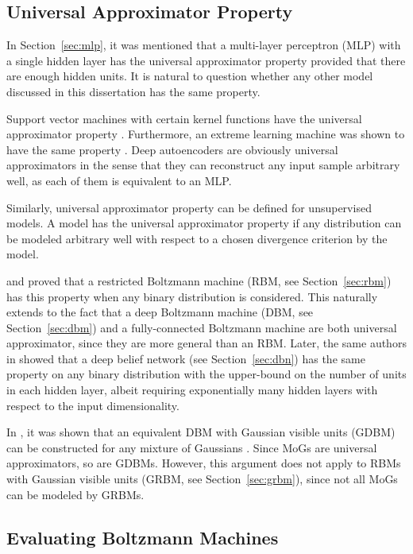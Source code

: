 \documentclass[dissertation,nocontribution,draft*]{aaltoseries}
\begin{document}
\subsection{Universal Approximator Property}
\label{sec:uap}

In Section~\ref{sec:mlp}, it was mentioned that a
multi-layer perceptron (MLP) with a single hidden layer has
the universal approximator property provided that there are
enough hidden units. %
It is natural to question whether any other model
discussed in this dissertation has the same property. 

Support vector machines with certain kernel functions have
the universal approximator property \citep{Hammer2003}.
Furthermore, an extreme learning machine was shown to have
the same property \citep{Huang2006tnn}. Deep autoencoders are
obviously universal approximators in the sense that they can
reconstruct any input sample arbitrary well, as each of them
is equivalent to an MLP.

Similarly, universal approximator property can be defined
for unsupervised models. A model has the universal
approximator property if any distribution can be modeled
arbitrary well with respect to a chosen divergence
criterion by the model.

\citet{Roux2008} and \citet{Freund1994}  proved that a
restricted Boltzmann machine (RBM, see
Section~\ref{sec:rbm}) has this property when any binary
distribution is considered. This naturally extends to the
fact that a deep Boltzmann machine (DBM, see
Section~\ref{sec:dbm}) and a fully-connected Boltzmann
machine are both universal approximator, since they are more
general than an RBM.  Later, the same authors in
\citep{Roux2010} showed that a deep belief network (see
Section~\ref{sec:dbn}) has the same property on any binary
distribution with the upper-bound on the number of units in
each hidden layer, albeit requiring exponentially many
hidden layers with respect to the input dimensionality. 

In , it was shown that an equivalent
DBM with Gaussian visible units (GDBM) can be constructed for any
mixture of Gaussians \citep[MoG, see, e.g.,][]{Bishop2006}.
Since MoGs are universal approximators, so are GDBMs.
However, this argument does not apply to RBMs with Gaussian
visible units (GRBM, see Section~\ref{sec:grbm}), since not
all MoGs can be modeled by GRBMs.

\subsection{Evaluating Boltzmann Machines}
\label{sec:eval_bm}
\end{document}
